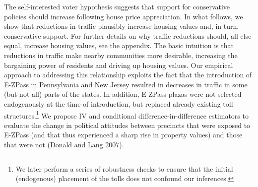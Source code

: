 The self-interested voter hypothesis suggests that support for conservative policies should increase following house price appreciation. In what follows, we show that reductions in traffic plausibly increase housing values and, in turn, conservative support. For further details on why traffic reductions should, all else equal, increase housing values, see the appendix. The basic intuition is that reductions in traffic make nearby communities more desirable, increasing the bargaining power of residents and driving up housing values. Our empirical approach to addressing this relationship exploits the fact that the introduction of E-ZPass in Pennsylvania and New Jersey resulted in decreases in traffic in some (but not all) parts of the states. In addition, E-ZPass plazas were not selected endogenously at the time of introduction, but replaced already existing toll structures.\footnote{We later perform a series of robustness checks to ensure that the initial (endogenous) placement of the tolls does not confound our inferences.} We propose IV and conditional difference-in-difference estimators to evaluate the change in political attitudes between precincts that were exposed to E-ZPass (and that thus experienced a sharp rise in property values) and those that were not (Donald and Lang 2007). 